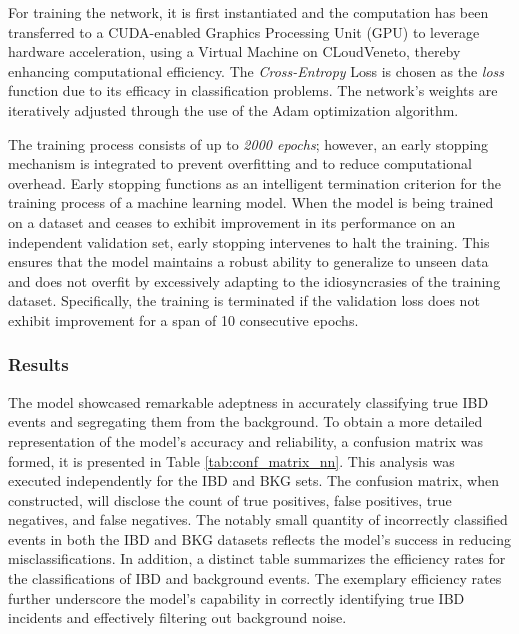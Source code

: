 For training the network, it is first instantiated and the computation has been transferred to a CUDA-enabled Graphics Processing Unit (GPU) to leverage hardware acceleration, using a Virtual Machine on CLoudVeneto, thereby enhancing computational efficiency. The \textit{Cross-Entropy} Loss is chosen as the \textit{loss} function due to its efficacy in classification problems. The network's weights are iteratively adjusted through the use of the Adam optimization algorithm.

The training process consists of up to \textit{2000 epochs}; however, an early stopping mechanism is integrated to prevent overfitting and to reduce computational overhead. Early stopping functions as an intelligent termination criterion for the training process of a machine learning model. When the model is being trained on a dataset and ceases to exhibit improvement in its performance on an independent validation set, early stopping intervenes to halt the training. This ensures that the model maintains a robust ability to generalize to unseen data and does not overfit by excessively adapting to the idiosyncrasies of the training dataset. 
Specifically, the training is terminated if the validation loss does not exhibit improvement for a span of 10 consecutive epochs.


\subsubsection{Results}
The model showcased remarkable adeptness in accurately classifying true IBD events and segregating them from the background. To obtain a more detailed representation of the model's accuracy and reliability, a confusion matrix was formed, it is presented in Table \ref{tab:conf_matrix_nn}. This analysis was executed independently for the IBD and BKG sets. The confusion matrix, when constructed, will disclose the count of true positives, false positives, true negatives, and false negatives. The notably small quantity of incorrectly classified events in both the IBD and BKG datasets reflects the model's success in reducing misclassifications. In addition, a distinct table summarizes the efficiency rates for the classifications of IBD and background events. The exemplary efficiency rates further underscore the model's capability in correctly identifying true IBD incidents and effectively filtering out background noise.


